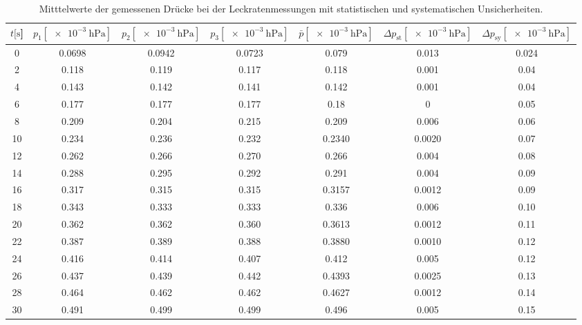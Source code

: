 %
\begin{table}[H]
  \centering
    \caption{Mitttelwerte der gemessenen Drücke bei der Leckratenmessungen mit statistischen und systematischen Unsicherheiten.}
    \label{tab:Turbo_Leck2}
    \begin{tabular}{
      S[table-format=3.0] 
      S[table-format=1.4] S[table-format=1.4] S[table-format=1.4]
      S[table-format=1.4] S[table-format=1.4] S[table-format=1.3]
      }
      \toprule
      {$t [\si{\second}$]} &
      {$p_1 [\SI{e-3}{\hecto\pascal}]$} & {$p_2 [\SI{e-3}{\hecto\pascal}]$} & {$p_3 [\SI{e-3}{\hecto\pascal}]$} &
      {$\bar{p} [\SI{e-3}{\hecto\pascal}]$} & {$\Delta p_\text{st} [\SI{e-3}{\hecto\pascal}]$} & {$\Delta p_\text{sy} [\SI{e-3}{\hecto\pascal}]$}\\
         & 0.0698 &  0.0942 &  0.0723 &  0.079  & 0.013  & 0.024  \\
      2   & 0.118  &  0.119  &  0.117  &  0.118  & 0.001  & 0.04   \\
      4   & 0.143  &  0.142  &  0.141  &  0.142  & 0.001  & 0.04   \\
      6   & 0.177  &  0.177  &  0.177  &  0.18   & 0      & 0.05   \\
      8   & 0.209  &  0.204  &  0.215  &  0.209  & 0.006  & 0.06   \\
      10  & 0.234  &  0.236  &  0.232  &  0.2340 & 0.0020 & 0.07   \\
      12  & 0.262  &  0.266  &  0.270  &  0.266  & 0.004  & 0.08   \\
      14  & 0.288  &  0.295  &  0.292  &  0.291  & 0.004  & 0.09   \\
      16  & 0.317  &  0.315  &  0.315  &  0.3157 & 0.0012 & 0.09   \\
      18  & 0.343  &  0.333  &  0.333  &  0.336  & 0.006  & 0.10   \\
      20  & 0.362  &  0.362  &  0.360  &  0.3613 & 0.0012 & 0.11   \\
      22  & 0.387  &  0.389  &  0.388  &  0.3880 & 0.0010 & 0.12   \\
      24  & 0.416  &  0.414  &  0.407  &  0.412  & 0.005  & 0.12   \\
      26  & 0.437  &  0.439  &  0.442  &  0.4393 & 0.0025 & 0.13   \\
      28  & 0.464  &  0.462  &  0.462  &  0.4627 & 0.0012 & 0.14   \\
      30  & 0.491  &  0.499  &  0.499  &  0.496  & 0.005  & 0.15   \\

\end{tabular}
\end{table}
